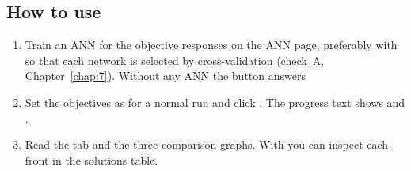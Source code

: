 \subsection{How to use}
\begin{enumerate}
  \item Train an ANN for the objective responses on the ANN page, preferably with  so that each network is selected by cross-validation (check~A, Chapter~\ref{chap:7}). Without any ANN the button
        answers 
  \item Set the objectives as for a normal run and click . The progress text shows
         and .
  \item Read the  tab and the three comparison graphs. With  you can inspect each front in
        the solutions table.
\end{enumerate}

